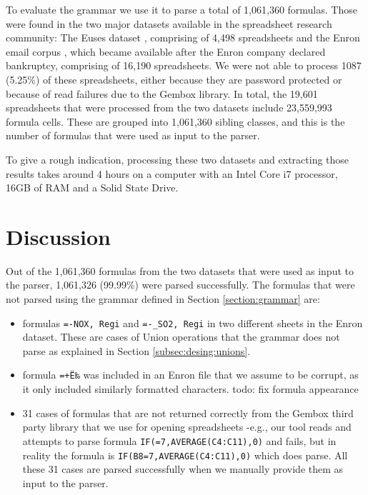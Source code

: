 \documentclass[conference]{IEEEtran}
\begin{document}
To evaluate the grammar we use it to parse a total of 1,061,360 formulas. Those were found in the two major datasets available in the spreadsheet research community: The Euses dataset \cite{euses}, comprising of 4,498 spreadsheets and the Enron email corpus \cite{enron}, which became available after the Enron company declared bankruptcy, comprising of 16,190 spreadsheets. We were not able to process 1087 (5.25\%) of these spreadsheets, either because they are password protected or because of read failures due to the Gembox library. In total, the 19,601 spreadsheets that were processed from the two datasets include 23,559,993 formula cells. These are grouped into 1,061,360 sibling classes, and this is the number of formulas that were used as input to the parser.

To give a rough indication, processing these two datasets and extracting those results takes around 4 hours on a computer with an Intel Core i7 processor, 16GB of RAM and a Solid State Drive.

\section{Discussion}
\label{sec:discussion}

Out of the 1,061,360 formulas from the two datasets that were used as input to the parser, 1,061,326 (99.99\%) were parsed successfully. The formulas that were not parsed using the grammar defined in Section \ref{section:grammar} are:

\begin{itemize}
	\item formulas \texttt{=-NOX, Regi} and \texttt{=-_SO2, Regi} in two different sheets in the Enron dataset. These are cases of Union operations that the grammar does not parse as explained in Section \ref{subsec:desing:unions}.
	\item formula \texttt{=+Ë‰} was included in an Enron file that we assume to be corrupt, as it only included similarly formatted characters. todo: fix formula appearance
	\item 31 cases of formulas that are not returned correctly from the Gembox third party library that we use for opening spreadsheets -e.g., our tool reads and attempts to parse formula \texttt{IF(=7,AVERAGE(C4:C11),0)} and fails, but in reality the formula is \texttt{IF(B8=7,AVERAGE(C4:C11),0)} which does parse. All these 31 cases are parsed successfully when we manually provide them as input to the parser.
\end{itemize}
\end{document}

